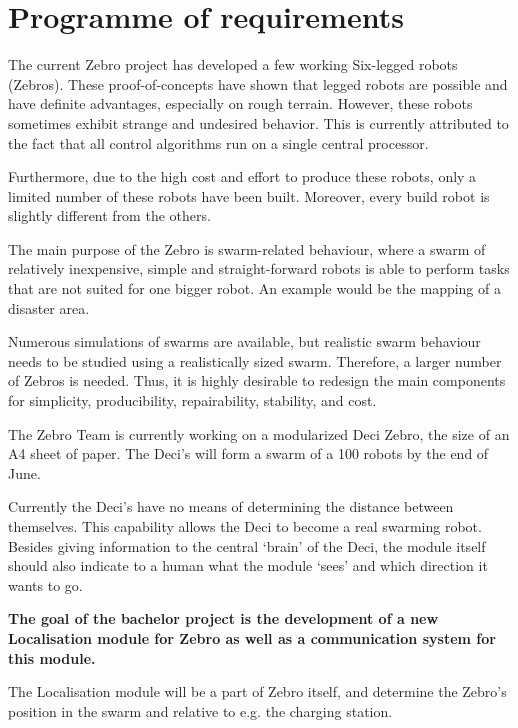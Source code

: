 \chapter{Programme of requirements}
\label{chap:por}

The current Zebro project has developed a few working Six-legged robots (Zebros).
These proof-of-concepts have shown that legged robots are possible and have definite advantages, especially on rough terrain.
However, these robots sometimes exhibit strange and undesired behavior.
This is currently attributed to the fact that all control algorithms run on a single central processor.

Furthermore, due to the high cost and effort to produce these robots, only a limited number of these robots have been built.
Moreover, every build robot is slightly different from the others.

The main purpose of the Zebro is swarm-related behaviour, where a swarm of relatively inexpensive, simple and straight-forward robots is able to perform tasks that are not suited for one bigger robot.
An example would be the mapping of a disaster area.

Numerous simulations of swarms are available, but realistic swarm behaviour needs to be studied using a realistically sized swarm.
Therefore, a larger number of Zebros is needed. Thus, it is highly desirable to redesign the main components for simplicity, producibility, repairability, stability, and cost.

The Zebro Team is currently working on a modularized Deci Zebro, the size of an A4 sheet of paper.
The Deci’s will form a swarm of a 100 robots by the end of June.

Currently the Deci’s have no means of determining the distance between themselves.
This capability allows the Deci to become a real swarming robot.
Besides giving information to the central ‘brain’ of the Deci, the module itself should also indicate to a human what the module ‘sees’ and which direction it wants to go.

\textbf{The goal of the bachelor project is the development of a new Localisation module for Zebro as well as a communication system for this module.}

The Localisation module will be a part of Zebro itself, and determine the Zebro’s position in the swarm and relative to e.g. the charging station.

